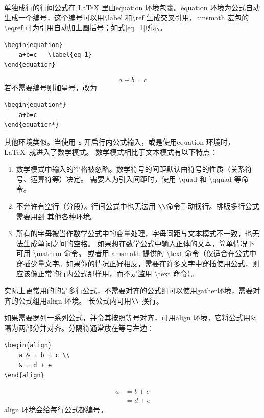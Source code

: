 单独成行的行间公式在 \LaTeX{} 里由equation 环境包裹。equation 环境为公式自动生成一个编号，这个编号可以用\textbackslash{}label 和\textbackslash{}ref 生成交叉引用，amsmath 宏包的\textbackslash{}eqref 可为引用自动加上圆括号；如式\eqref{eq_1}所示。
\begin{lstlisting}
\begin{equation}
	a+b=c	\label{eq_1}
\end{equation}
\end{lstlisting}
\begin{equation}
	a+b=c	\label{eq_1}
\end{equation}
若不需要编号则加星号，改为
\begin{lstlisting}
\begin{equation*}
	a+b=c
\end{equation*}
\end{lstlisting}
其他环境类似。当使用 \texttt\$ 开启行内公式输入，或是使用{equation} 环境时，\LaTeX\ 就进入了数学模式。
数学模式相比于文本模式有以下特点：
\begin{enumerate}
	\item 数学模式中输入的空格被忽略。数学符号的间距默认由符号的性质（关系符号、运算符等）决定。
	需要人为引入间距时，使用 \textbackslash{}{quad} 和 \textbackslash{}{qquad} 等命令。
	\item {不允许有空行（分段）}。行间公式中也无法用 $ \verb|\\|$命令手动换行。排版多行公式需要用到 其他各种环境。
	\item 所有的字母被当作数学公式中的变量处理，字母间距与文本模式不一致，也无法生成单词之间的空格。
	如果想在数学公式中输入正体的文本，简单情况下可用 \textbackslash{}{mathrm} 命令。
	或者用 {amsmath} 提供的 \textbackslash{}{text} 命令（仅适合在公式中穿插少量文字。如果你的情况正好相反，需要在许多文字中穿插使用公式，则应该像正常的行内公式那样用，而不是滥用 \textbackslash{}{text} 命令）。
\end{enumerate}	

实际上更常用的的是多行公式，不需要对齐的公式组可以使用gather环境，需要对齐的公式组用align 环境。
长公式内可用$ \verb|\\|$ 换行。

如果需要罗列一系列公式，并令其按照等号对齐，可用align 环境，它将公式用\& 隔为两部分并对齐。分隔符通常放在等号左边：
\begin{lstlisting}
\begin{align}
	a & = b + c \\
	& = d + e
\end{align}
\end{lstlisting}
\begin{align}
a & = b + c \\
& = d + e
\end{align}
align 环境会给每行公式都编号。

